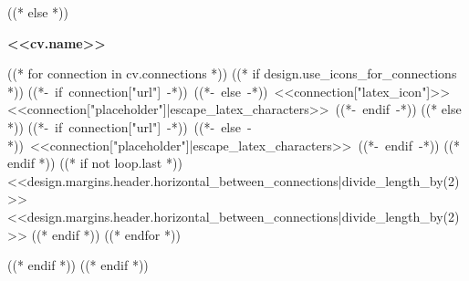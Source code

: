         \vspace{10pt}
    ((* else *))
        \begin{header}
            \fontsize{<<design.header_font_size>>}{<<design.header_font_size>>}
            \textbf{<<cv.name>>}

            \vspace{<<design.margins.header.vertical_between_name_and_connections>>}

            \normalsize
            ((* for connection in cv.connections *))
                ((* if design.use_icons_for_connections *))
            \mbox{((*- if connection["url"] -*))
                ((*- else -*))
                {\footnotesize<<connection["latex_icon"]>>}\hspace*{0.13cm}<<connection["placeholder"]|escape_latex_characters>>
                ((*- endif -*))}%
                ((* else *))
            \mbox{((*- if connection["url"] -*))
                ((*- else -*))
                <<connection["placeholder"]|escape_latex_characters>>
                ((*- endif -*))}%
                ((* endif *))
                ((* if not loop.last *))
            \kern <<design.margins.header.horizontal_between_connections|divide_length_by(2)>>%
            \AND%
            \kern <<design.margins.header.horizontal_between_connections|divide_length_by(2)>>%
                ((* endif *))
            ((* endfor *))
        \end{header}
    ((* endif *))
\vspace{<<design.margins.header.bottom>> - <<design.margins.section_title.top>>}
((* endif *))